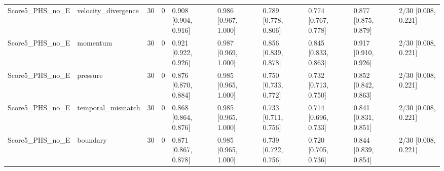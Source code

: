 \begin{table}
\begin{tabular}{llllllllll}
Score5\_PHS\_no\_E & velocity\_divergence & 30 & 0 & 0.908 [0.904, 0.916] & 0.986 [0.967, 1.000] & 0.789 [0.778, 0.806] & 0.774 [0.767, 0.778] & 0.877 [0.875, 0.879] & 2/30 [0.008, 0.221] \\
Score5\_PHS\_no\_E & momentum & 30 & 0 & 0.921 [0.922, 0.926] & 0.987 [0.969, 1.000] & 0.856 [0.839, 0.878] & 0.845 [0.833, 0.863] & 0.917 [0.910, 0.926] & 2/30 [0.008, 0.221] \\
Score5\_PHS\_no\_E & pressure & 30 & 0 & 0.876 [0.870, 0.884] & 0.985 [0.965, 1.000] & 0.750 [0.733, 0.772] & 0.732 [0.713, 0.750] & 0.852 [0.842, 0.863] & 2/30 [0.008, 0.221] \\
Score5\_PHS\_no\_E & temporal\_mismatch & 30 & 0 & 0.868 [0.864, 0.876] & 0.985 [0.965, 1.000] & 0.733 [0.711, 0.756] & 0.714 [0.696, 0.733] & 0.841 [0.831, 0.851] & 2/30 [0.008, 0.221] \\
Score5\_PHS\_no\_E & boundary & 30 & 0 & 0.871 [0.867, 0.878] & 0.985 [0.965, 1.000] & 0.739 [0.722, 0.756] & 0.720 [0.705, 0.736] & 0.844 [0.839, 0.854] & 2/30 [0.008, 0.221] \\
\bottomrule
\end{tabular}
\end{table}

